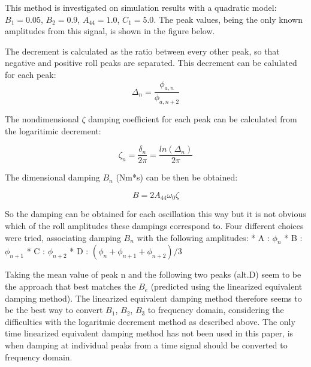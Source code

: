 This method is investigated on simulation results with a quadratic
model: \(B_1 = 0.05\), \(B_2 = 0.9\), \(A_{44} = 1.0\), \(C_1 = 5.0\).
The peak values, being the only known amplitudes from this signal, is
shown in the figure below.

    \begin{figure}
        \begin{center}\end{center}
        \caption{}
        \label{}
    \end{figure}
    
    The decrement is calculated as the ratio between every other peak, so
that negative and positive roll peaks are separated. This decrement can
be calulated for each peak:
\[ \Delta_n = \frac{\phi_{a,n}}{\phi_{a,n+2}}\]

    The nondimensional \(\zeta\) damping coefficient for each peak can be
calculated from the logaritimic decrement:

    \[\zeta_n = \frac{\delta_n}{2\pi}=\frac{ln(\Delta_n)}{2\pi}\]

    The dimensional damping \(B_n\) (Nm*s) can be then be obtained:
 
            
    
    \begin{equation}
B = 2 A_{44} \omega_{0} \zeta
\label{eq:equation}
\end{equation}

    

    So the damping can be obtained for each oscillation this way but it is
not obvious which of the roll amplitudes these dampings correspond to.
Four different choices were tried, associating damping \(B_n\) with the
following amplitudes: * A : \(\phi_n\) * B : \(\phi_{n+1}\) * C :
\(\phi_{n+2}\) * D : \((\phi_n + \phi_{n+1} + \phi_{n+2})/3\)

    \begin{figure}
        \begin{center}\end{center}
        \caption{}
        \label{}
    \end{figure}
    
    Taking the mean value of peak n and the following two peaks (alt.D) seem
to be the approach that best matches the \(B_e\) (predicted using the
linearized equivalent damping method). The linearized equivalent damping
method therefore seems to be the best way to convert \(B_1\), \(B_2\),
\(B_3\) to frequency domain, considering the difficulties with the
logaritmic decrement method as described above. The only time linearized
equivalent damping method has not been used in this paper, is when
damping at individual peaks from a time signal should be converted to
frequency domain.

